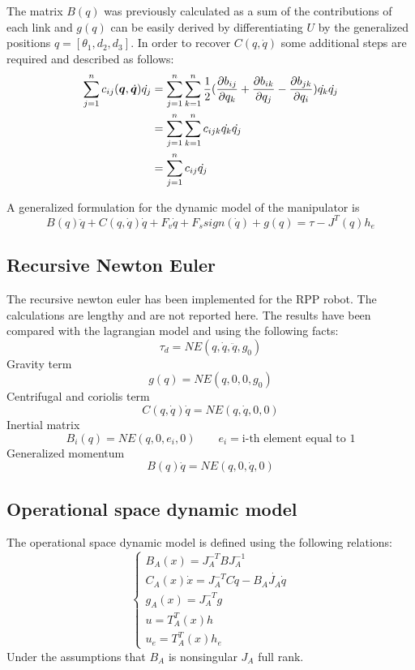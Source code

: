 \documentclass[a4paper,12pt]{article}
\newcommand*{\q}{\bm{q}}
\newcommand*{\dotq}{\dot{\q}}
\begin{document}
\noindent The matrix $B(q)$ was previously calculated as a sum of the contributions of each link and $g(q)$ can be easily derived by differentiating $U$ by the generalized positions $q = [\theta_1,d_2, d_3]$. In order to recover $C(q,\dot{q})$ some additional steps are required and described as follows:
\begin{equation}
    \begin{aligned}
        \sum_{j=1}^{n} c_{ij}(\q, \dotq)\dot{q_j}  &= \sum_{j=1}^{n}\sum_{k=1}^{n} \frac{1}{2} (\pdv{b_{ij}}{q_k}+\pdv{b_{ik}}{q_j}-\pdv{b_{jk}}{q_i})\dot{q_k}\dot{q_j} \\
         &= \sum_{j=1}^{n}\sum_{k=1}^{n} c_{ijk}\dot{q_k}\dot{q_j} \\
         &= \sum_{j=1}^{n} c_{ij}\dot{q_j}
    \end{aligned}
\end{equation}

\noindent A generalized formulation for the dynamic model of the manipulator is
\[
    B(q)\ddot{q} + C(q, \dot{q})\dot{q} + F_v\dot{q} + F_ssign(\dot{q}) + g(q) = \tau - J^{T}(q)h_e  
\]
\subsection{Recursive Newton Euler}
The recursive newton euler has been implemented for the RPP robot. The calculations are lengthy and are not reported here. The results have been compared with the lagrangian model and using the following facts:
\bigskip
\[
    \tau_{d} = NE(q,\dot{q}, \ddot{q}, g_{0})
\]
\noindent Gravity term
\[
    g(q) = NE(q,0,0,g_0)
\]
Centrifugal and coriolis term
\[
    C(q,\dot{q})\dot{q} = NE(q,\dot{q},0,0)
\]
Inertial matrix
\[
    B_i(q) = NE(q,0,e_i,0) \qquad e_i = \text{i-th element equal to 1}
\]
Generalized momentum
\[
    B(q)\dot{q} = NE(q,0,\dot{q},0)
\]
\subsection{Operational space dynamic model}
The operational space dynamic model is defined using the following relations:
\[
    \begin{cases}
    B_{A}(x) = J_{A}^{-T}BJ_A^{-1} \\
    C_{A}(x)\dot{x} = J_{A}^{-T}C\dot{q} - B_{A}\dot{J_{A}}\dot{q} \\
    g_{A}(x) = J_{A}^{-T}g \\
    u = T_{A}^T(x) h \\
    u_e = T_{A}^T(x)h_{e}
    \end{cases}
\]
Under the assumptions that $B_{A}$ is nonsingular $J_{A}$ full rank.
\end{document}
